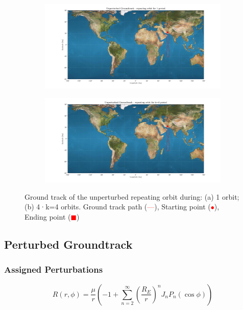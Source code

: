 \documentclass{article}
\newcommand{\reddashedline}{\textcolor{red}{---}}
\begin{document}
\begin{figure}[ht]
	\centering
	\begin{subfigure}[b]{0.45\textwidth}
		\includegraphics[width=\textwidth]{ugro1orb.png}
		\caption{}
		\label{fig:1a}
	\end{subfigure}
	\hfill
	\begin{subfigure}[b]{0.45\textwidth}
		\includegraphics[width=\textwidth]{ugro4orb.png}
		\caption{}
		\label{fig:1b}
	\end{subfigure}
	
	\caption{Ground track of the unperturbed repeating orbit during: (a) 1 orbit; (b) 4·k=4 orbits. Ground track path (\reddashedline), Starting point (\textcolor{red}{$\bullet$}), Ending point (\textcolor{red}{$\blacksquare$})
	}
\end{figure}

\subsection{Perturbed Groundtrack}
\subsubsection{Assigned Perturbations}

\begin{equation*}
	R(r, \phi) = \frac{\mu}{r} \left( -1 + \sum_{n=2}^{\infty} \left( \frac{R_E}{r} \right)^n J_n P_n(\cos\phi) \right)
\end{equation*}
\end{document}
